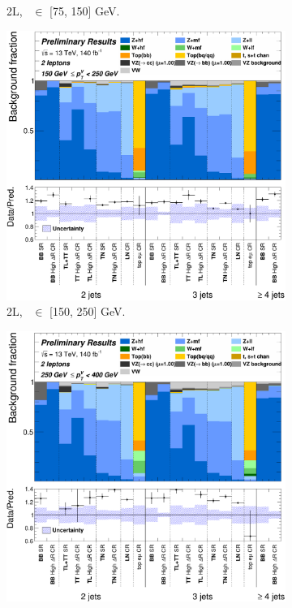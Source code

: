 \begin{figure}[h!]
{\begin{subfigure}[b]{0.38\textwidth}
            \caption{2L, \ptv\ $\in$ [75, 150] GeV.}
            \label{fig:backCom_2L_1}
        \end{subfigure}
        \begin{subfigure}[b]{0.38\textwidth}
            \centering
            \includegraphics[width=\textwidth]{Images/VH/Own_fit/backCom_uncPrefit/GlobalFit_unconditional__Prefit/C_SRCRs_L2_BMax250_BMin150.png}
            \caption{2L, \ptv\ $\in$ [150, 250] GeV.}
            \label{fig:backCom_2L_2}
        \end{subfigure}
        \begin{subfigure}[b]{0.38\textwidth}
            \centering
            \includegraphics[width=\textwidth]{Images/VH/Own_fit/backCom_uncPrefit/GlobalFit_unconditional__Prefit/C_SRCRs_L2_BMax400_BMin250.png}

\end{subfigure}}
\end{figure}
